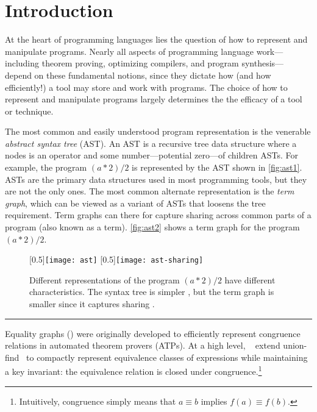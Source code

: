 \chapter{Introduction}
\label{sec:intro}

At the heart of programming languages
 lies the question of how to represent and manipulate programs.
Nearly all aspects of programming language work---including
 theorem proving, optimizing compilers, and program synthesis---%
 depend on these fundamental notions,
 since they dictate
 how (and how efficiently!) a tool may
 store and work with programs.
The choice of how to represent and manipulate programs
 largely determines the the efficacy of a tool or technique.

The most common and easily understood
 program representation is the venerable
 \textit{abstract syntax tree} (AST).
An AST is a recursive tree data structure
 where a nodes is an operator and
 some number---potential zero---of children ASTs.
For example, the program $(a * 2) / 2$
 is represented by the AST shown in \autoref{fig:ast1}.
ASTs are the primary data structures used in most programming tools,
 but they are not the only ones.
The most common alternate representation is the \textit{term graph},
 which can be viewed as a variant of ASTs that loosens the tree requirement.
Term graphs can there for capture sharing across common parts of a
 program (also known as a term).
\autoref{fig:ast2} shows a term graph for the program $(a * 2) / 2$.

\begin{figure}
    [0.5\linewidth]{\texttt{[image: ast]}}
    [0.5\linewidth]{\texttt{[image: ast-sharing]}}
  \caption{
    Different representations of the program $(a * 2) / 2$ have
     different characteristics.
    The syntax tree is simpler ,
     but the term graph is smaller since it captures sharing .
  }\label{fig:ast}
\end{figure}

\begin{quote}
  \it\Thesisstmt
\end{quote}

\hrule

Equality graphs (\egraphs) were originally developed to
  efficiently represent congruence relations
  in automated theorem provers (ATPs).
At a high level, \egraphs~\cite{nelson, pp-congr}
  extend union-find~\cite{unionfind} to compactly represent
  equivalence classes of expressions while
  maintaining a key invariant:
  the equivalence relation is closed under congruence.\footnote{
    Intuitively, congruence simply means
    that $a \equiv b$ implies $f(a) \equiv f(b)$.}

